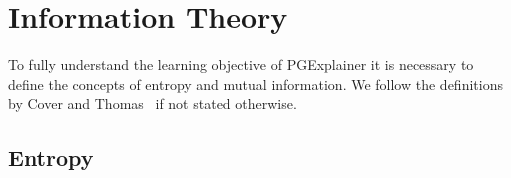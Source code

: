 
\section{Information Theory}
\label{sec:information_theory}
To fully understand the learning objective of PGExplainer it is necessary to define the concepts of entropy and mutual information. We follow the definitions by Cover and Thomas~\cite{Cover2005} if not stated otherwise.

\subsection{Entropy}

